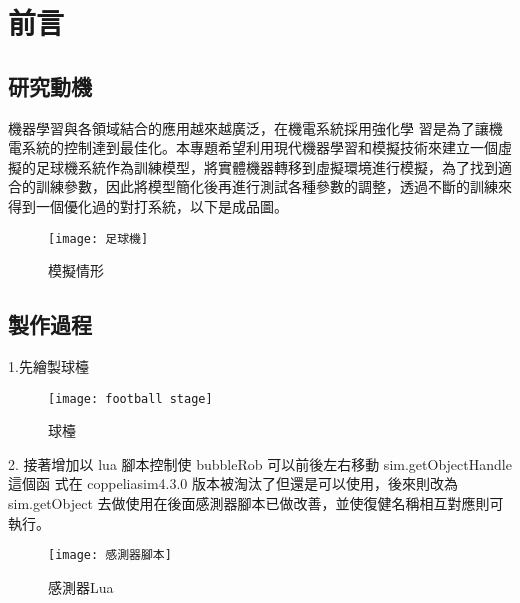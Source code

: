 \chapter{前言}
\renewcommand{\baselinestretch}{10.0} %
\setcounter{page}{1}  %
\fontsize{14pt}{2.5pt}\sectionef
\section{研究動機}
機器學習與各領域結合的應用越來越廣泛，在機電系統採用強化學
習是為了讓機電系統的控制達到最佳化。本專題希望利用現代機器學習和模擬技術來建立一個虛擬的足球機系統作為訓練模型，將實體機器轉移到虛擬環境進行模擬，為了找到適合的訓練參數，因此將模型簡化後再進行測試各種參數的調整，透過不斷的訓練來得到一個優化過的對打系統，以下是成品圖。
\\

\begin{figure}[hbt!]
\begin{center}
\texttt{[image: 足球機]}
\caption{\Large 模擬情形}\label{fig.足球機}
\end{center}
\end{figure}
\newpage



\section{製作過程}

1.先繪製球檯\\
\begin{figure}[hbt!]
\begin{center}
\texttt{[image: football stage]}
\caption{\Large 球檯}\label{fig.football stage}
\end{center}
\end{figure}

2. 接著增加以 lua 腳本控制使 bubbleRob 可以前後左右移動 sim.getObjectHandle 這個函
式在 coppeliasim4.3.0 版本被淘汰了但還是可以使用，後來則改為 sim.getObject
去做使用在後面感測器腳本已做改善，並使復健名稱相互對應則可執行。\\

\begin{figure}[hbt!]
\begin{center}
\texttt{[image: 感測器腳本]}
\caption{\Large 感測器Lua}\label{fig.感測器腳本}
\end{center}
\end{figure}
\newpage

